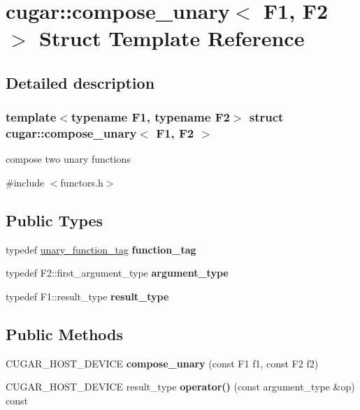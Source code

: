 \hypertarget{structcugar_1_1compose__unary}{}\section{cugar\+:\+:compose\+\_\+unary$<$ F1, F2 $>$ Struct Template Reference}
\label{structcugar_1_1compose__unary}


\subsection{Detailed description}
\subsubsection*{template$<$typename F1, typename F2$>$\newline
struct cugar\+::compose\+\_\+unary$<$ F1, F2 $>$}

compose two unary functions 

{\ttfamily \#include $<$functors.\+h$>$}

\subsection*{Public Types}
\begin{DoxyCompactItemize}
\item 
\mbox{\label{structcugar_1_1compose__unary_a4a1d58a5dae30f78fe5871c85f24e965}} 
typedef \hyperlink{structcugar_1_1unary__function__tag}{unary\+\_\+function\+\_\+tag} {\bfseries function\+\_\+tag}
\item 
\mbox{\label{structcugar_1_1compose__unary_ad4bd284e582454066bdfa203ca5421e4}} 
typedef F2\+::first\+\_\+argument\+\_\+type {\bfseries argument\+\_\+type}
\item 
\mbox{\label{structcugar_1_1compose__unary_a220e54601a4de08d80d57c741a805f65}} 
typedef F1\+::result\+\_\+type {\bfseries result\+\_\+type}
\end{DoxyCompactItemize}
\subsection*{Public Methods}
\begin{DoxyCompactItemize}
\item 
\mbox{\label{structcugar_1_1compose__unary_aa9dcdb62a4b94e740060bbd68a3a4210}} 
C\+U\+G\+A\+R\+\_\+\+H\+O\+S\+T\+\_\+\+D\+E\+V\+I\+CE {\bfseries compose\+\_\+unary} (const F1 f1, const F2 f2)
\item 
\mbox{\label{structcugar_1_1compose__unary_a9e8892faa48c68486a0bf9de6ac795ca}} 
C\+U\+G\+A\+R\+\_\+\+H\+O\+S\+T\+\_\+\+D\+E\+V\+I\+CE result\+\_\+type {\bfseries operator()} (const argument\+\_\+type \&op) const
\end{DoxyCompactItemize}


